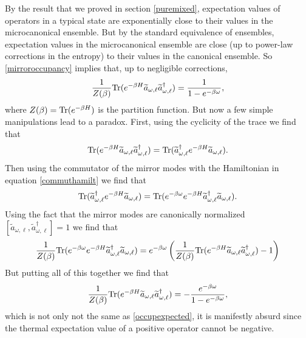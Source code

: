 \documentclass[12pt]{article}
\newcommand{\cop}[1]{#1}
\def\ta{\widetilde{\cop{a}}}
\def\tr{{\rm Tr}}
\newcommand{\be}{\begin{equation}}
\newcommand{\ee}{\end{equation}}
\begin{document}
By the result that we proved in section \ref{puremixed}, expectation values of operators in a typical state are exponentially close to their values in the microcanonical ensemble. But by the standard equivalence of ensembles,
expectation values in the microcanonical ensemble are close (up to power-law corrections in the entropy) to their values in the canonical ensemble. So \eqref{mirroroccupancy} implies that, up to negligible corrections,
\be
\label{occupexpected}
{1 \over Z(\beta)}\tr(e^{-\beta H} \ta_{\omega, \ell} \ta_{\omega, \ell}^{\dagger}) = {1 \over 1 - e^{-\beta \omega}},
\ee
where $Z(\beta) = \tr(e^{-\beta H})$ is the partition function.
But now a few simple manipulations lead to a paradox. First, using the cyclicity of the trace we find that
\be
\label{occupcyclicity}
\tr(e^{-\beta H} \ta_{\omega, \ell} \ta_{\omega, \ell}^{\dagger}) = \tr(\ta_{\omega, \ell}^{\dagger} e^{-\beta H} \ta_{\omega, \ell}).
\ee
Then using the commutator of the mirror modes with the Hamiltonian in equation \eqref{commuthamilt} we find that
\be
\tr(\ta_{\omega, \ell}^{\dagger} e^{-\beta H} \ta_{\omega, \ell}) = \tr( e^{-{\beta \omega}} e^{-\beta H} \ta_{\omega, \ell}^{\dagger} \ta_{\omega, \ell}).
\ee
Using the fact that the mirror modes are canonically normalized $[\ta_{\omega, \ell}, \ta_{\omega, \ell}^{\dagger}] = 1$ we find that
\be
{1 \over Z(\beta)} \tr( e^{-{\beta \omega}} e^{-\beta H} \ta_{\omega, \ell}^{\dagger} \ta_{\omega, \ell}) = e^{-{\beta \omega}} \left({1 \over Z(\beta)}\tr(e^{-\beta H} \ta_{\omega, \ell} \ta_{\omega, \ell}^{\dagger}) - 1 \right)
\ee
But putting all of this together we find that 
\be
{1 \over Z(\beta)}\tr(e^{-\beta H} \ta_{\omega, \ell} \ta_{\omega, \ell}^{\dagger}) = -{e^{-{\beta \omega}}  \over 1 - e^{-\beta \omega}},
\ee
which is not only not the same as \eqref{occupexpected}, it is manifestly absurd since the thermal expectation value of a positive operator cannot be negative. 
\end{document}
